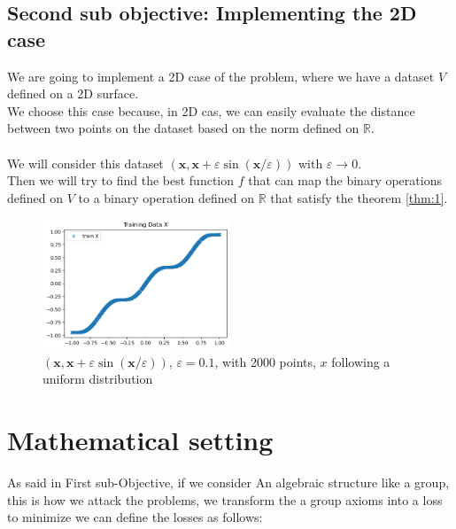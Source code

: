 \documentclass{article}
\begin{document}
        \subsection*{Second sub objective: Implementing the 2D case}
            We are going to implement a 2D case of the problem, where we have a dataset $V$ defined on a 2D surface.
            \\ 
            We choose this case because, in 2D cas, we can easily evaluate the distance between two points on the dataset based on the norm defined on $\mathbb{R}$.
            \\
            \\
            We will consider this dataset 
            $(\mathbf{x}, \mathbf{x}+\varepsilon \sin (\mathbf{x} / \varepsilon))$ with $\varepsilon \rightarrow 0$.
            \\
            Then we will try to find the best function $f$ that can map the binary operations defined on $V$ to a binary operation defined on $\mathbb{R}$ that satisfy the theorem \ref{thm:1}.
            \newpage
            \begin{figure}
                \centering
                \includegraphics[width=0.5\textwidth]{./images/M.png}
                \caption{$(\mathbf{x}, \mathbf{x}+\varepsilon \sin (\mathbf{x} / \varepsilon))$,  $\varepsilon = 0.1$, with 2000 points, $x$ following a uniform distribution}
            \end{figure}
        
\section{Mathematical setting}

    As said in  First sub-Objective, if we consider An algebraic structure like a group, this is how  we attack the problems, we transform the a group axioms into a loss to minimize we can define the losses as follows: 
\end{document}

